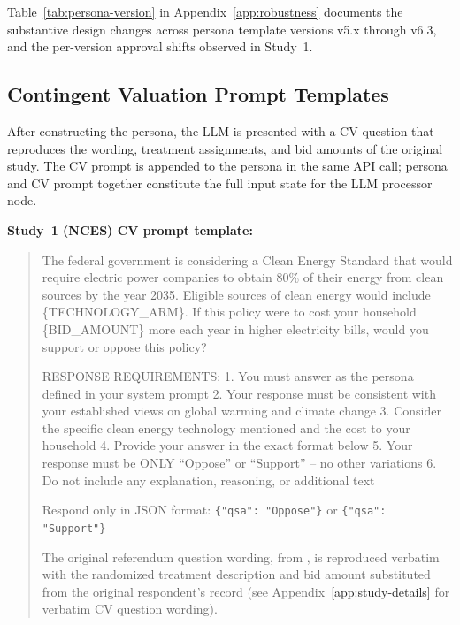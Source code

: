 \documentclass[12pt]{article}
\begin{document}
Table~\ref{tab:persona-version} in Appendix~\ref{app:robustness} documents the substantive design changes across persona template versions v5.x through v6.3, and the per-version approval shifts observed in Study~1.

\subsection{Contingent Valuation Prompt Templates}\label{app:platform-prompts}

After constructing the persona, the LLM is presented with a CV question that reproduces the wording, treatment assignments, and bid amounts of the original study. The CV prompt is appended to the persona in the same API call; persona and CV prompt together constitute the full input state for the LLM processor node.

\medskip\noindent\textbf{Study~1 (NCES) CV prompt template:}
\begin{quote}
The federal government is considering a Clean Energy Standard that would require electric power companies to obtain 80\% of their energy from clean sources by the year 2035. Eligible sources of clean energy would include \{TECHNOLOGY\_ARM\}. If this policy were to cost your household \{BID\_AMOUNT\} more each year in higher electricity bills, would you support or oppose this policy?

RESPONSE REQUIREMENTS:
1. You must answer as the persona defined in your system prompt
2. Your response must be consistent with your established views on global warming and climate change
3. Consider the specific clean energy technology mentioned and the cost to your household
4. Provide your answer in the exact format below
5. Your response must be ONLY ``Oppose'' or ``Support'' -- no other variations
6. Do not include any explanation, reasoning, or additional text

Respond only in JSON format: \texttt{\{"qsa": "Oppose"\}} or \texttt{\{"qsa": "Support"\}}

\smallskip The original referendum question wording, from \citet{Aldy2012}, is reproduced verbatim with the randomized treatment description and bid amount substituted from the original respondent's record (see Appendix~\ref{app:study-details} for verbatim CV question wording).
\end{quote}
\end{document}
